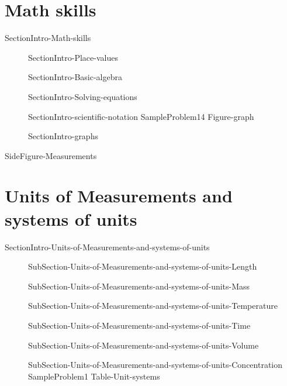 \documentclass[main.tex]{subfiles}
\begin{document}
\section{Math skills}{SectionIntro-Math-skills}
\sloppy\begin{description}
\item[]{SectionIntro-Place-values}
\item[]{SectionIntro-Basic-algebra}
\item[]{SectionIntro-Solving-equations}
\item[]{SectionIntro-scientific-notation}
{SampleProblem14}%
{Figure-graph}
\item[]{SectionIntro-graphs}
\end{description}



{SideFigure-Measurements}\section{Units of Measurements and systems of units}
{SectionIntro-Units-of-Measurements-and-systems-of-units}
\sloppy\begin{description}
\item[]{SubSection-Units-of-Measurements-and-systems-of-units-Length}
\item[]{SubSection-Units-of-Measurements-and-systems-of-units-Mass}
\item[]{SubSection-Units-of-Measurements-and-systems-of-units-Temperature}
\item[]{SubSection-Units-of-Measurements-and-systems-of-units-Time}
\item[]{SubSection-Units-of-Measurements-and-systems-of-units-Volume}
\item[]{SubSection-Units-of-Measurements-and-systems-of-units-Concentration}
{SampleProblem1}%
{Table-Unit-systems}
\end{description}
\end{document}
